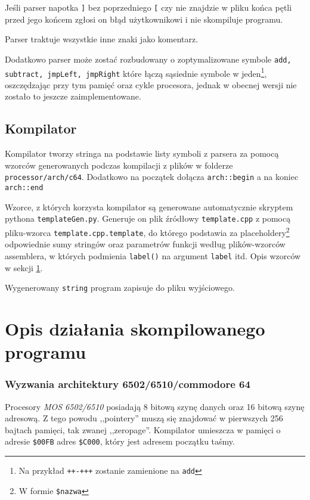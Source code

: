 \documentclass[a4paper,12pt]{article}
\begin{document}
    Jeśli parser napotka \texttt{]} bez poprzedniego \texttt{[} czy nie znajdzie w pliku końca pętli przed jego końcem zgłosi on błąd użytkownikowi i nie skompiluje programu.

    Parser traktuje wszystkie inne znaki jako komentarz.
    
    Dodatkowo parser może zostać rozbudowany o zoptymalizowane symbole \texttt{add, subtract, jmpLeft, jmpRight} które łączą sąsiednie symbole w jeden\footnote{Na przykład \texttt{++-+++} zostanie zamienione na \texttt{add}}, oszczędzając przy tym pamięć oraz cykle procesora, jednak w obecnej wersji nie zostało to jeszcze zaimplementowane. 

    \subsection*{Kompilator}

    Kompilator tworzy stringa na podstawie listy symboli z parsera za pomocą wzorców generowanych podczas kompilacji z plików w folderze \texttt{processor/arch/c64}. Dodatkowo na początek dołącza \texttt{arch::begin} a na koniec \texttt{arch::end}

    Wzorce, z których korzysta kompilator są generowane automatycznie skryptem pythona \texttt{templateGen.py}. Generuje on plik źródłowy \texttt{template.cpp} z pomocą pliku-wzorca \texttt{template.cpp.template}, do którego podstawia za placeholdery\footnote{W formie \texttt{\$nazwa}} odpowiednie sumy stringów oraz parametrów funkcji według plików-wzorców assemblera, w których podmienia \texttt{label()} na argument \texttt{label} itd. Opis wzorców w sekcji \ref{wzorce}.


    Wygenerowany \texttt{string} program zapisuje do pliku wyjściowego.

    \section{Opis działania skompilowanego programu}\label{wzorce}
    
    \subsubsection*{Wyzwania architektury 6502/6510/commodore 64}

    Procesory \emph{MOS 6502/6510} posiadają 8 bitową szynę danych oraz 16 bitową szynę adresową. Z tego powodu ,,pointery'' muszą się znajdować w pierwszych 256 bajtach pamięci, tak zwanej ,,zeropage''. Kompilator umieszcza w pamięci o adresie \texttt{\$00FB} adres \texttt{\$C000}, który jest adresem początku taśmy. 
\end{document}
